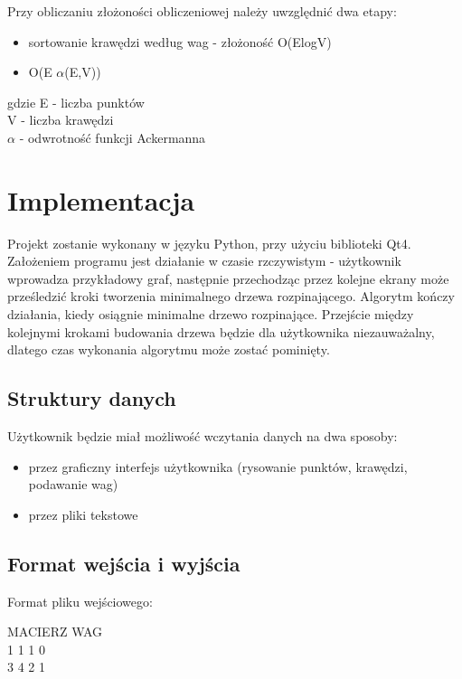 \documentclass[paper=a4, fontsize=11pt]{scrartcl} %
\numberwithin{equation}{section} %
\numberwithin{figure}{section} %
\numberwithin{table}{section} %
\begin{document}
Przy obliczaniu złożoności obliczeniowej należy uwzględnić dwa etapy:
\begin{itemize}
	\item sortowanie krawędzi według wag - złożoność O(ElogV)
	\item O(E $\alpha$(E,V))
\end{itemize}
gdzie E - liczba punktów \\
V - liczba krawędzi \\
$\alpha$ - odwrotność funkcji Ackermanna

\section{Implementacja}

Projekt zostanie wykonany w języku Python, przy użyciu biblioteki Qt4. Założeniem programu jest działanie w czasie rzczywistym - użytkownik wprowadza przykładowy graf, następnie przechodząc przez kolejne ekrany może prześledzić kroki tworzenia minimalnego drzewa rozpinającego. Algorytm kończy działania, kiedy osiągnie minimalne drzewo rozpinające.
Przejście między kolejnymi krokami budowania drzewa będzie dla użytkownika niezauważalny, dlatego  czas wykonania algorytmu może zostać pominięty.

\subsection{Struktury danych}

Użytkownik będzie miał możliwość wczytania danych na dwa sposoby:

\begin{itemize}
\item przez graficzny interfejs użytkownika (rysowanie punktów, krawędzi, podawanie wag)
\item przez pliki tekstowe
\end{itemize}

\subsection{Format wejścia i wyjścia}

Format pliku wejściowego:

\begin{center}
MACIERZ WAG \\

1 1 1 0 \\
3 4 2 1
\end{center}
\end{document}
